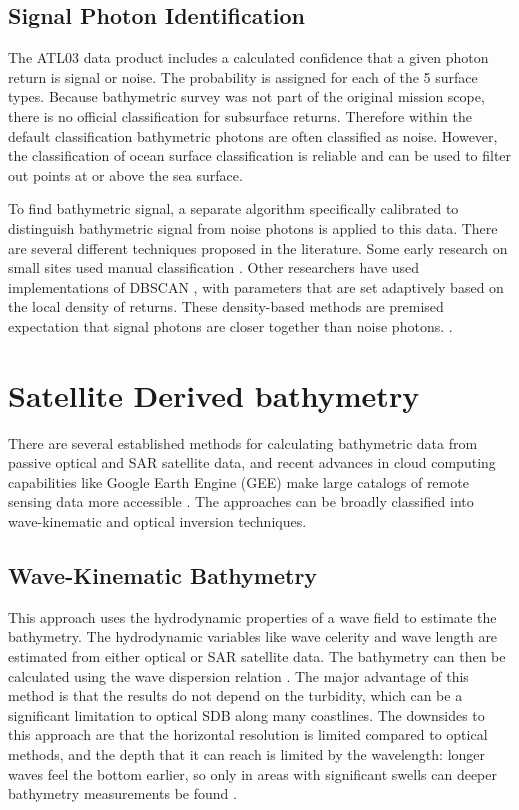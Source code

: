 \subsection{Signal Photon Identification}
\label{subsec:denoising}
The ATL03 data product includes a calculated confidence that a given photon return is signal or noise. The probability is assigned for each of the 5 surface types. Because bathymetric survey was not part of the original mission scope, there is no official classification for subsurface returns. Therefore within the default classification bathymetric photons are often classified as noise. However, the classification of ocean surface classification is reliable \parencite{}  and can be used to filter out points at or above the sea surface. 

To find bathymetric signal, a separate algorithm specifically calibrated to distinguish bathymetric signal from noise photons is applied to this data. There are several different techniques proposed in the literature.  Some early research on small sites used manual classification \parencite{Forfinski-Sarkozi2016}. Other researchers have used implementations of DBSCAN \parencite{Ester1996}, with parameters that are set adaptively based on the local density of returns. These density-based methods are premised expectation that signal photons are closer together than noise photons. \parencite{Neuenschwander2019}.


\section{Satellite Derived bathymetry}
There are several established methods for calculating bathymetric data from passive optical and SAR satellite data, and recent advances in cloud computing capabilities like Google Earth Engine (GEE) \parencite{Gorelick2017a} make large catalogs of remote sensing data more accessible \parencite{Pike2019,Turner2021}. The  approaches can be broadly classified into wave-kinematic and optical inversion techniques.

\subsection{Wave-Kinematic Bathymetry}
This approach uses the hydrodynamic properties of a wave field to estimate the bathymetry. The hydrodynamic variables like wave celerity and wave length are estimated from either optical or SAR satellite data. The bathymetry can then be calculated using the wave dispersion relation \cite{Almar2021e}. The major advantage of this method is that the results do not depend on the turbidity, which can be a significant limitation to optical SDB along many coastlines. The downsides to this approach are that the horizontal resolution is limited compared to optical methods, and the depth that it can reach is limited by the wavelength: longer waves feel the bottom earlier, so only in areas with significant swells can deeper bathymetry measurements be found \parencite{Almar2021e}.

